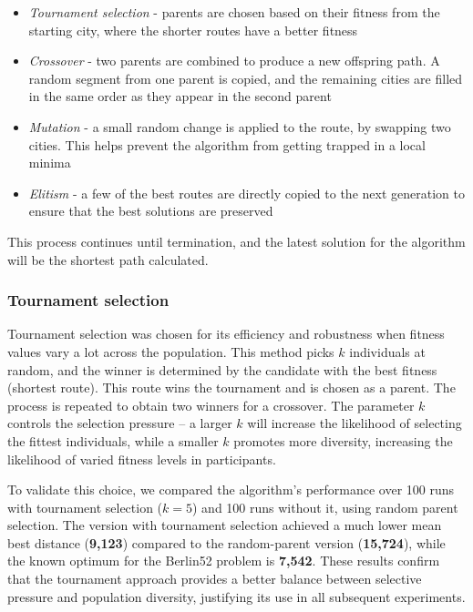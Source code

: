 \documentclass{scrartcl}
\begin{document}
\begin{itemize}
    \item \textit{Tournament selection} - parents are chosen based on their fitness from the starting city, where the shorter routes have a better fitness
    \item \textit{Crossover} - two parents are combined to produce a new offspring path. A random segment from one parent is copied, and the remaining cities are filled in the same order as they appear in the second parent
    \item \textit{Mutation} - a small random change is applied to the route,  by swapping two cities. This helps prevent the algorithm from getting trapped in a local minima
    \item \textit{Elitism} - a few of the best routes are directly copied to the next generation to ensure that the best solutions are preserved
\end{itemize}

This process continues until termination, and the latest solution for the algorithm will be the shortest path calculated. 

\subsubsection{Tournament selection}

Tournament selection was chosen for its efficiency and robustness when fitness
values vary a lot across the population. This method picks $k$ individuals at
random, and the winner is determined by the candidate with the best fitness (shortest
route). This route wins the tournament and is chosen as a parent. The process
is repeated to obtain two winners for a crossover. The parameter $k$ controls the
selection pressure – a larger $k$ will increase the likelihood of selecting the fittest
individuals, while a smaller $k$ promotes more diversity, increasing the likelihood of
varied fitness levels in participants.

To validate this choice, we compared the algorithm's performance over 100 runs 
with tournament selection ($k=5$) and 100 runs without it, using random parent selection.  
The version with tournament selection achieved a much lower mean best distance 
(\textbf{9,123}) compared to the random-parent version (\textbf{15,724}), while the known optimum 
for the Berlin52 problem is \textbf{7,542}.  
These results confirm that the tournament approach provides a better balance between 
selective pressure and population diversity, justifying its use in all subsequent experiments.
\end{document}
